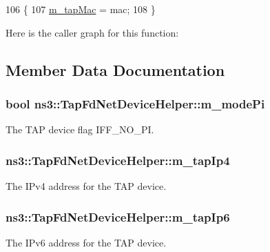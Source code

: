 \begin{DoxyCode}
106 \{
107   \hyperlink{classns3_1_1TapFdNetDeviceHelper_a9a9956264595716d15dce3a036621437}{m\_tapMac} = mac;
108 \}
\end{DoxyCode}


Here is the caller graph for this function\+:




\subsection{Member Data Documentation}
\subsubsection[{\texorpdfstring{m\+\_\+mode\+Pi}{m_modePi}}]{\setlength{\rightskip}{0pt plus 5cm}bool ns3\+::\+Tap\+Fd\+Net\+Device\+Helper\+::m\+\_\+mode\+Pi\hspace{0.3cm}{\ttfamily [protected]}}\hypertarget{classns3_1_1TapFdNetDeviceHelper_a4d9d824e6c5ac46ac9ebc34740cedd2b}{}\label{classns3_1_1TapFdNetDeviceHelper_a4d9d824e6c5ac46ac9ebc34740cedd2b}
The T\+AP device flag I\+F\+F\+\_\+\+N\+O\+\_\+\+PI. 
\subsubsection[{\texorpdfstring{m\+\_\+tap\+Ip4}{m_tapIp4}}]{ ns3\+::\+Tap\+Fd\+Net\+Device\+Helper\+::m\+\_\+tap\+Ip4\hspace{0.3cm}{\ttfamily [protected]}}\hypertarget{classns3_1_1TapFdNetDeviceHelper_a7f090cc7edb3f77def84e7a47614e3f4}{}\label{classns3_1_1TapFdNetDeviceHelper_a7f090cc7edb3f77def84e7a47614e3f4}
The I\+Pv4 address for the T\+AP device. 
\subsubsection[{\texorpdfstring{m\+\_\+tap\+Ip6}{m_tapIp6}}]{ ns3\+::\+Tap\+Fd\+Net\+Device\+Helper\+::m\+\_\+tap\+Ip6\hspace{0.3cm}{\ttfamily [protected]}}\hypertarget{classns3_1_1TapFdNetDeviceHelper_a6538c02cba836fd1b88779ea48d5d947}{}\label{classns3_1_1TapFdNetDeviceHelper_a6538c02cba836fd1b88779ea48d5d947}
The I\+Pv6 address for the T\+AP device. 
